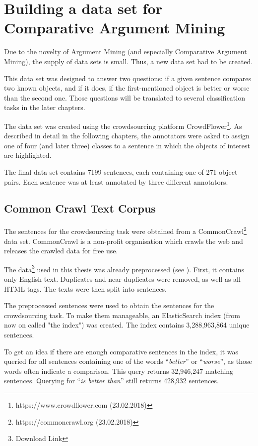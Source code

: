 \chapter{Building a data set for Comparative Argument Mining}
\label{sec:prestudy}
Due to the novelty of Argument Mining (and especially Comparative Argument Mining), the supply of data sets is small. Thus, a new data set had to be created.

This data set was designed to answer two questions: if a given sentence compares two known objects, and if it does, if the first-mentioned object is better or worse than the second one. Those questions will be translated to several classification tasks in the later chapters.

The data set was created using the crowdsourcing platform CrowdFlower\footnote{https://www.crowdflower.com (23.02.2018)}. As described in detail in the following chapters, the annotators were asked to assign one of four (and later three) classes to a sentence in which the objects of interest are highlighted.

The final data set contains 7199 sentences, each containing one of 271 object pairs. Each sentence was at least annotated by three different annotators.

\section{Common Crawl Text Corpus}
The sentences for the crowdsourcing task were obtained from a CommonCrawl\footnote{https://commoncrawl.org (23.02.2018)} data set. CommonCrawl is a non-profit organisation which crawls the web and releases the crawled data for free use.

The data\footnote{Download Link} used in this thesis was already preprocessed (see \cite{Panchenko:2017aa}). First, it contains only English text. Duplicates and near-duplicates were removed, as well as all HTML tags. The texts were then split into sentences.

The preprocessed sentences were used to obtain the sentences for the crowdsourcing task. To make them manageable, an ElasticSearch index (from now on called "the index") was created. The index contains 3,288,963,864 unique sentences.

To get an idea if there are enough comparative sentences in the index, it was queried for all sentences containing one of the words \enquote{\emph{better}} or \enquote{\emph{worse}},  as those words often indicate a comparison. This query returns 32,946,247 matching sentences. Querying for \enquote{\emph{is better than}} still returns 428,932 sentences.

